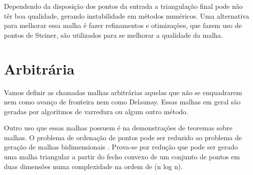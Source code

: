  Dependendo da disposição dos pontos da entrada a triangulação final pode não têr boa qualidade, gerando instabilidade em métodos numéricos. Uma alternativa para melhorar essa malha é fazer refinamentos e otimizações, que fazem uso de pontos de Steiner, são utilizados para se melhorar a qualidade da malha.

\section{Arbitrária}

Vamos definir as chamadas malhas arbitrárias aquelas que não se enquadrarem nem como avanço de fronteira nem como Delaunay. Essas malhas em geral são geradas por algoritmos de varredura ou algum outro método. 

Outro uso que essas malhas possuem é na demonstrações de teoremas sobre malhas. O problema de ordenação de pontos pode ser reduzido ao problema de geração de malhas bidimensionais \cite{bib:CarvalhoFigueiredo91}. Prova-se por redução que pode ser gerado uma malha triangular a partir do fecho convexo de um conjunto de pontos em duas dimensões numa complexidade na ordem de (n log n).
